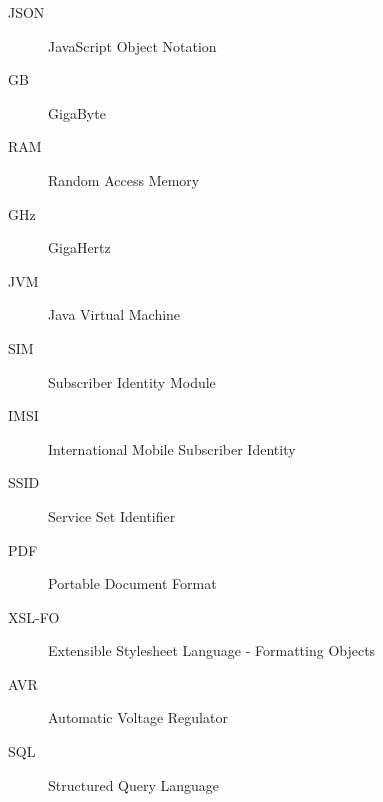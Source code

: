 \begin{singlespace}
\begin{description}
\item[JSON]{JavaScript Object Notation}

\item[GB]{GigaByte}

\item[RAM]{Random Access Memory}

\item[GHz]{GigaHertz}

\item[JVM]{Java Virtual Machine}

\item[SIM]{Subscriber Identity Module}

\item[IMSI]{International Mobile Subscriber Identity}

\item[SSID]{Service Set Identifier}

\item[PDF]{Portable Document Format}

\item[XSL-FO]{Extensible Stylesheet Language - Formatting Objects}

\item[AVR]{Automatic Voltage Regulator}

\item[SQL]{Structured Query Language}

\end{description}

\end{singlespace}
